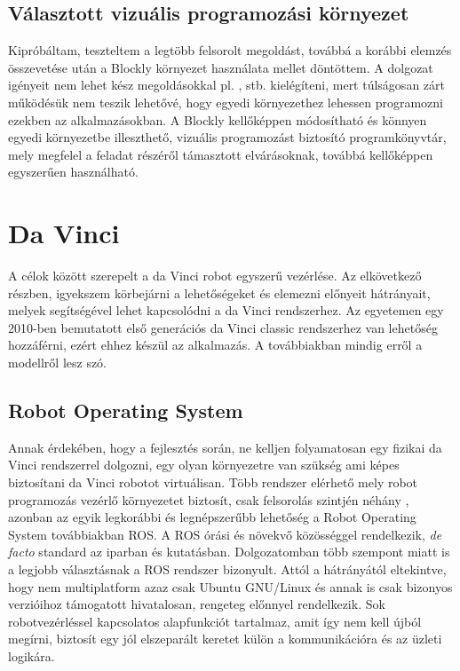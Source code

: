 \documentclass[12pt,a4paper,oneside]{report} %
\begin{document}
\subsection{Választott vizuális programozási környezet}
Kipróbáltam, teszteltem a legtöbb felsorolt megoldást, továbbá a korábbi elemzés összevetése  után a Blockly környezet használata mellet döntöttem.
A dolgozat igényeit nem lehet kész megoldásokkal pl. ,  stb. kielégíteni, mert túlságosan zárt működésük nem teszik lehetővé, hogy egyedi környezethez lehessen programozni ezekben az alkalmazásokban.
A Blockly kellőképpen módosítható és könnyen egyedi környezetbe illeszthető, vizuális programozást biztosító programkönyvtár, mely megfelel a feladat részéről támasztott elvárásoknak, továbbá kellőképpen egyszerűen használható.


\section{Da Vinci}
A célok között szerepelt a da Vinci robot egyszerű vezérlése. 
Az elkövetkező részben, igyekszem körbejárni a lehetőségeket és elemezni előnyeit hátrányait, melyek segítségével lehet kapcsolódni a da Vinci rendszerhez. Az egyetemen egy 2010-ben bemutatott első generációs da Vinci classic rendszerhez van lehetőség hozzáférni, ezért ehhez készül az alkalmazás. A továbbiakban mindig erről a modellről lesz szó.
\subsection{Robot Operating System}
Annak érdekében, hogy a fejlesztés során, ne kelljen folyamatosan egy fizikai da Vinci rendszerrel dolgozni, egy olyan környezetre van szükség ami képes biztosítani da Vinci robotot virtuálisan. Több rendszer elérhető mely robot programozás vezérlő környezetet biztosít, csak felsorolás szintjén néhány \cite{BibEntry2020May, montemerlo2003perspectives}, azonban az egyik legkorábbi és legnépszerűbb lehetőség a Robot Operating System \cite{quigley2009ros} továbbiakban ROS. A ROS órási és növekvő közösséggel rendelkezik, \textit{de facto} standard az iparban és kutatásban. Dolgozatomban több szempont miatt is a legjobb választásnak a ROS rendszer bizonyult. Attól a hátrányától eltekintve, hogy nem multiplatform azaz csak Ubuntu GNU/Linux és annak is csak bizonyos verzióihoz támogatott hivatalosan, rengeteg előnnyel rendelkezik. Sok robotvezérléssel kapcsolatos alapfunkciót tartalmaz, amit így nem kell újból megírni, biztosít egy jól elszeparált keretet külön a kommunikációra és az üzleti logikára.
\end{document}

